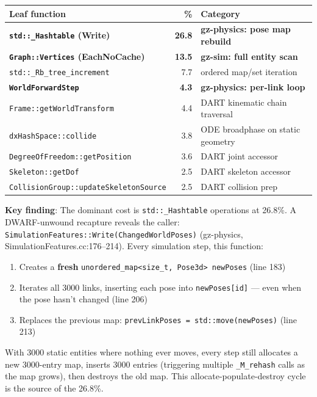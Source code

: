 \documentclass[11pt, a4paper]{article}
\begin{document}
\begin{longtable}[]{@{}lrl@{}}
\toprule\noalign{}
Leaf function & \% & Category \\
\midrule\noalign{}
\endhead
\bottomrule\noalign{}
\endlastfoot
\textbf{\texttt{std::\_Hashtable} (Write)} & \textbf{26.8} & \textbf{gz-physics: pose map rebuild} \\
\textbf{\texttt{Graph::Vertices} (EachNoCache)} & \textbf{13.5} & \textbf{gz-sim: full entity scan} \\
\texttt{std::\_Rb\_tree\_increment} & 7.7 & ordered map/set iteration \\
\textbf{\texttt{WorldForwardStep}} & \textbf{4.3} & \textbf{gz-physics: per-link loop} \\
\texttt{Frame::getWorldTransform} & 4.4 & DART kinematic chain traversal \\
\texttt{dxHashSpace::collide} & 3.8 & ODE broadphase on static geometry \\
\texttt{DegreeOfFreedom::getPosition} & 3.6 & DART joint accessor \\
\texttt{Skeleton::getDof} & 2.5 & DART skeleton accessor \\
\texttt{CollisionGroup::updateSkeletonSource} & 2.5 & DART collision prep \\
\end{longtable}

\textbf{Key finding}: The dominant cost is \texttt{std::\_Hashtable} operations at 26.8\%. A DWARF-unwound recapture reveals the caller: \texttt{SimulationFeatures::Write(ChangedWorldPoses)} (gz-physics, SimulationFeatures.cc:176--214). Every simulation step, this function:

\begin{enumerate}
\item Creates a \textbf{fresh} \texttt{unordered\_map<size\_t, Pose3d> newPoses} (line 183)
\item Iterates all 3000 links, inserting each pose into \texttt{newPoses[id]} --- even when the pose hasn't changed (line 206)
\item Replaces the previous map: \texttt{prevLinkPoses = std::move(newPoses)} (line 213)
\end{enumerate}

With 3000 static entities where nothing ever moves, every step still allocates a new 3000-entry map, inserts 3000 entries (triggering multiple \texttt{\_M\_rehash} calls as the map grows), then destroys the old map. This allocate-populate-destroy cycle is the source of the 26.8\%.
\end{document}

